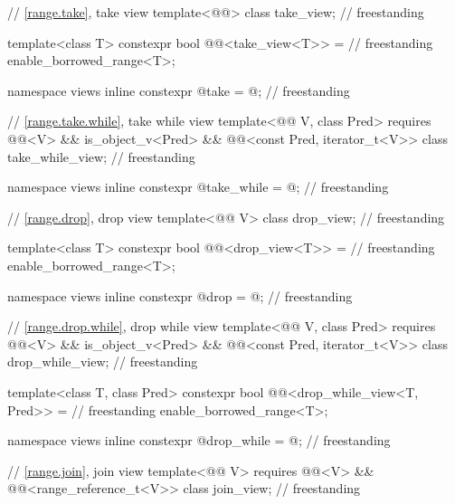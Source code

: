 \begin{codeblock}
{  // \ref{range.take}, take view
  template<@@> class take_view;                                                   // freestanding

  template<class T>
    constexpr bool @@<take_view<T>> =                            // freestanding
      enable_borrowed_range<T>;

  namespace views { inline constexpr @\unspecnc@ take = @\unspecnc@; }              // freestanding

  // \ref{range.take.while}, take while view
  template<@@ V, class Pred>
    requires @@<V> && is_object_v<Pred> &&
             @@<const Pred, iterator_t<V>>
    class take_while_view;                                                          // freestanding

  namespace views { inline constexpr @\unspecnc@ take_while = @\unspecnc@; }        // freestanding

  // \ref{range.drop}, drop view
  template<@@ V>
    class drop_view;                                                                // freestanding

  template<class T>
    constexpr bool @@<drop_view<T>> =                            // freestanding
      enable_borrowed_range<T>;

  namespace views { inline constexpr @\unspecnc@ drop = @\unspecnc@; }              // freestanding

  // \ref{range.drop.while}, drop while view
  template<@@ V, class Pred>
    requires @@<V> && is_object_v<Pred> &&
             @@<const Pred, iterator_t<V>>
    class drop_while_view;                                                          // freestanding

  template<class T, class Pred>
    constexpr bool @@<drop_while_view<T, Pred>> =                // freestanding
      enable_borrowed_range<T>;

  namespace views { inline constexpr @\unspecnc@ drop_while = @\unspecnc@; }        // freestanding

  // \ref{range.join}, join view
  template<@@ V>
    requires @@<V> && @@<range_reference_t<V>>
  class join_view;                                                                  // freestanding

}
\end{codeblock}
